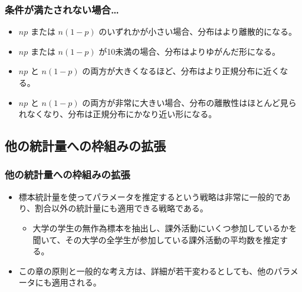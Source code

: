 
\begin{frame}
\frametitle{条件が満たされない場合…}

\begin{itemize}

\item $np$ または $n(1-p)$ のいずれかが小さい場合、分布はより離散的になる。
\item $np$ または $n(1-p)$ が10未満の場合、分布はよりゆがんだ形になる。
\item $np$ と $n(1-p)$ の両方が大きくなるほど、分布はより正規分布に近くなる。
\item $np$ と $n(1-p)$ の両方が非常に大きい場合、分布の離散性はほとんど見られなくなり、分布は正規分布にかなり近い形になる。

\end{itemize}

\end{frame}


\subsection{他の統計量への枠組みの拡張}


\begin{frame}
\frametitle{他の統計量への枠組みの拡張}

\begin{itemize}

\item 標本統計量を使ってパラメータを推定するという戦略は非常に一般的であり、割合以外の統計量にも適用できる戦略である。

\begin{itemize}
\item 大学の学生の無作為標本を抽出し、課外活動にいくつ参加しているかを聞いて、その大学の全学生が参加している課外活動の平均数を推定する。
\end{itemize}

\item この章の原則と一般的な考え方は、詳細が若干変わるとしても、他のパラメータにも適用される。

\end{itemize}

\end{frame}
